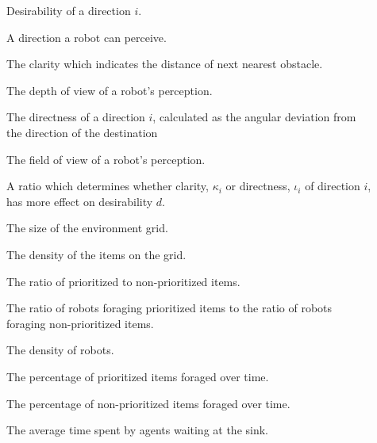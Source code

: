 \begin{description}
	\item[\parbox{\namewidth}{$d$}] Desirability of a direction $i$.
	\item[\parbox{\namewidth}{$i$}] A direction a robot can perceive.
	
	\item[\parbox{\namewidth}{$\kappa_i$}] The clarity which indicates the distance of next nearest obstacle.
	 
	\item[\parbox{\namewidth}{$v$}] The depth of view of a robot's perception.

	\item[\parbox{\namewidth}{$\iota_i$}] The directness of a direction $i$, calculated as the angular deviation from the direction of the destination

	\item[\parbox{\namewidth}{$f$}] The	field of view of a robot's perception.
		
	\item[\parbox{\namewidth}{$\lambda$}] A ratio which determines whether clarity, $\kappa_i$ or directness, $\iota_i$ of direction $i$, has more effect on desirability $d$.
	
	\item[\parbox{\namewidth}{$S$}] The	size of the environment grid.

	\item[\parbox{\namewidth}{$p$}] The density of the items on the grid.

	\item[\parbox{\namewidth}{$r$}] The ratio of prioritized to non-prioritized items.

	\item[\parbox{\namewidth}{$\tau$}] The ratio of robots foraging prioritized items to the ratio of robots foraging non-prioritized items.

	\item[\parbox{\namewidth}{$c$}] The density of robots.

	\item[\parbox{\namewidth}{$\sigma$}] The percentage of prioritized items foraged over time.

	\item[\parbox{\namewidth}{$\mu$}] The percentage of non-prioritized items foraged over time.

	\item[\parbox{\namewidth}{$\epsilon$}] The average time spent by agents waiting at the sink.
	
\end{description}
